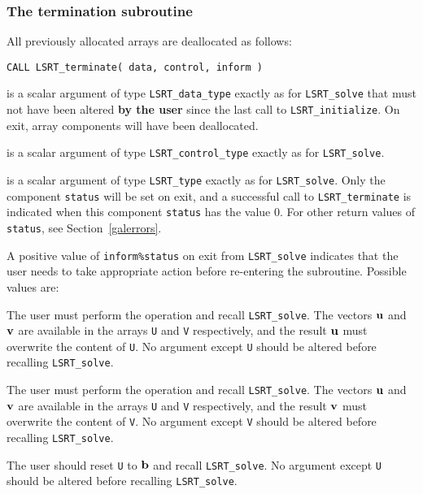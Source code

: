 \documentclass{galahad}
\newcommand{\packagename}{LS\-RT}
\begin{document}

\subsubsection{The  termination subroutine}
All previously allocated arrays are deallocated as follows:

\hskip0.5in 
{\tt CALL \packagename\_terminate( data, control, inform )}

\begin{description}

 is a scalar \intentinout argument of type 
{\tt \packagename\_data\_type} 
exactly as for
{\tt \packagename\_solve}
that must not have been altered {\bf by the user} since the last call to 
{\tt \packagename\_initialize}.
On exit, array components will have been deallocated. 

 is a scalar \intentin argument of type 
{\tt \packagename\_control\_type}
exactly as for
{\tt \packagename\_solve}.

 is a scalar \intentout argument of type {\tt \packagename\_type}
exactly as for
{\tt \packagename\_solve}.
Only the component {\tt status} will be set on exit, and a 
successful call to 
{\tt \packagename\_terminate}
is indicated when this  component {\tt status} has the value 0. 
For other return values of {\tt status}, see Section~\ref{galerrors}.

\end{description}


\galreverse
A positive value of {\tt inform\%status} on exit from  
{\tt \packagename\_solve} indicates that the user needs to take appropriate 
action before re-entering the subroutine. Possible values are: 
 
\begin{description} 
 
 The user must perform the operation  
\disp{\bmu := \bmu + \bmA \bmv,}
and recall {\tt \packagename\_solve}. 
The vectors ${\mathbf{u}}$ and ${\mathbf{v}}$ are available in the arrays {\tt U}
and {\tt V} respectively, and the result  
${\mathbf{u}}$ must overwrite the content of {\tt U}. 
No argument except {\tt U} should be altered before recalling 
{\tt \packagename\_solve}. 
 
 The user must perform the operation  
and recall {\tt \packagename\_solve}. 
The vectors ${\mathbf{u}}$ and ${\mathbf{v}}$ are available in the arrays {\tt U}
and {\tt V} respectively, and the result  
${\mathbf{v}}$ must overwrite the content of {\tt V}. 
No argument except {\tt V} should be altered before recalling 
{\tt \packagename\_solve}. 
 
  The user should reset {\tt U} to ${\mathbf{b}}$ and recall 
{\tt \packagename\_solve}. 
No argument except {\tt U} should be altered before recalling 
{\tt \packagename\_solve}. 
\end{description} 
\end{document}
